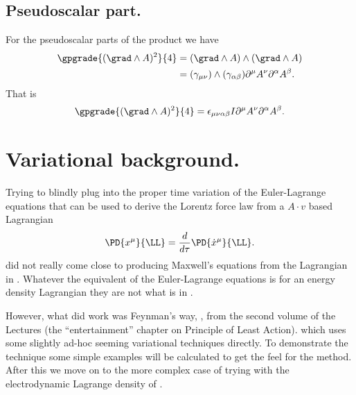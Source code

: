 \subsection{Pseudoscalar part.}
%
For the pseudoscalar parts of the product we have
\begin{equation}\label{eqn:lagrangianFieldDensity:140}
\begin{aligned}
\gpgrade{ (\grad \wedge A)^2 }{4} &= (\grad \wedge A) \wedge (\grad \wedge A) \\
&= (\gamma_{\mu\nu}) \wedge (\gamma_{\alpha\beta}) \partial^{\mu} A^{\nu} \partial^{\alpha} A^{\beta} .
\end{aligned}
\end{equation}
%
That is
%
\begin{equation}\label{eqn:maxFieldLag:pseudoscalarFieldSquare}
\gpgrade{ (\grad \wedge A)^2 }{4} = \epsilon_{\mu\nu\alpha\beta} I \partial^{\mu} A^{\nu} \partial^{\alpha} A^{\beta}.
\end{equation}
%
%
%
\section{Variational background.}
%
Trying to blindly plug into the proper time variation of the Euler-Lagrange equations that can be used to derive the Lorentz force law from a \(A \cdot v\) based Lagrangian
%
\begin{equation}\label{eqn:maxFieldLag:eulerlag}
\PD{x^\mu}{\LL} = \frac{d}{d\tau} \PD{\dot{x}^\mu}{\LL}.
\end{equation}
%
did not really come close to producing Maxwell's equations from the Lagrangian in .  Whatever the equivalent of the Euler-Lagrange equations is for an energy density Lagrangian they are not what is in .

However, what did work was Feynman's way, \citep{feynman1963flp}, from the second volume of the Lectures (the ``entertainment'' chapter on Principle of Least Action).
which uses some slightly ad-hoc seeming variational techniques directly.  To demonstrate the technique some simple examples
will be calculated to get the feel for the method.  After this we move on to the more complex case of trying with the electrodynamic Lagrange density of .
%

